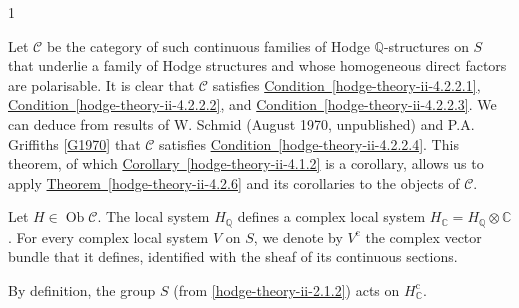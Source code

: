 \begin{footnote}{1}
\begin{enumerate}
    \end{enumerate}\par{}Let \(\mathcal {C}\) be the category of such continuous families of Hodge \(\mathbb {Q}\)-structures on \(S\) that underlie a family of Hodge structures and whose homogeneous direct factors are polarisable.
    It is clear that \(\mathcal {C}\) satisfies \hyperref[hodge-theory-ii-4.2.2.1]{Condition~\ref*{hodge-theory-ii-4.2.2.1}}, \hyperref[hodge-theory-ii-4.2.2.2]{Condition~\ref*{hodge-theory-ii-4.2.2.2}}, and \hyperref[hodge-theory-ii-4.2.2.3]{Condition~\ref*{hodge-theory-ii-4.2.2.3}}.
    We can deduce from results of W. Schmid (August 1970, unpublished) and P.A. Griffiths [\hyperref[G1970]{G1970}] that \(\mathcal {C}\) satisfies \hyperref[hodge-theory-ii-4.2.2.4]{Condition~\ref*{hodge-theory-ii-4.2.2.4}}.
    This theorem, of which \hyperref[hodge-theory-ii-4.1.2]{Corollary~\ref*{hodge-theory-ii-4.1.2}} is a corollary, allows us to apply \hyperref[hodge-theory-ii-4.2.6]{Theorem~\ref*{hodge-theory-ii-4.2.6}} and its corollaries to the objects of \(\mathcal {C}\).\end{footnote}\par{}Let \(H\in \operatorname {Ob}\mathcal {C}\).
  The local system \(H_\mathbb {Q}\) defines a complex local system \(H_\mathbb {C}=H_\mathbb {Q}\otimes \mathbb {C}\).
  For every complex local system \(V\) on \(S\), we denote by \(V^\mathrm {c}\) the complex vector bundle that it defines, identified with the sheaf of its continuous sections.\par{}By definition, the group \(S\) (from \cref{hodge-theory-ii-2.1.2}) acts on \(H_\mathbb {C}^\mathrm {c}\).
